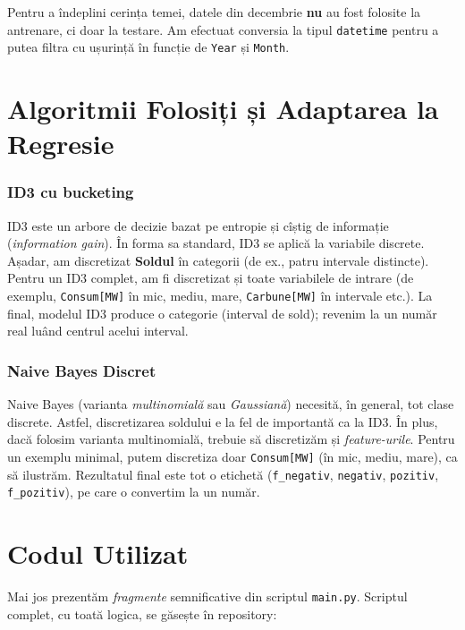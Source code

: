\documentclass[12pt,a4paper]{article}
\begin{document}
Pentru a îndeplini cerința temei, datele din decembrie \textbf{nu} au fost folosite la antrenare, ci doar la testare. Am efectuat conversia la tipul \texttt{datetime} pentru a putea filtra cu ușurință în funcție de \texttt{Year} și \texttt{Month}.

\section*{Algoritmii Folosiți și Adaptarea la Regresie}

\subsubsection*{ID3 cu bucketing}
ID3 este un arbore de decizie bazat pe entropie și cîștig de informație (\emph{information gain}). În forma sa standard, ID3 se aplică la variabile discrete. Așadar, am discretizat \textbf{Soldul} în categorii (de ex., patru intervale distincte). Pentru un ID3 complet, am fi discretizat și toate variabilele de intrare (de exemplu, \texttt{Consum[MW]} în mic, mediu, mare, \texttt{Carbune[MW]} în intervale etc.). 
La final, modelul ID3 produce o categorie (interval de sold); 
revenim la un număr real luând centrul acelui interval.

\subsubsection*{Naive Bayes Discret}
Naive Bayes (varianta \emph{multinomială} sau \emph{Gaussiană}) necesită, în general, tot clase discrete. Astfel, discretizarea soldului e la fel de importantă ca la ID3. În plus, dacă folosim varianta multinomială, trebuie să discretizăm și \emph{feature-urile}. Pentru un exemplu minimal, putem discretiza doar \texttt{Consum[MW]} (în mic, mediu, mare), ca să ilustrăm. Rezultatul final este tot o etichetă (\texttt{f\_negativ}, \texttt{negativ}, \texttt{pozitiv}, \texttt{f\_pozitiv}), pe care o convertim la un număr.

\section*{Codul Utilizat}

Mai jos prezentăm \emph{fragmente} semnificative din scriptul \texttt{main.py}. Scriptul complet, cu toată logica, se găsește în repository:
\end{document}
